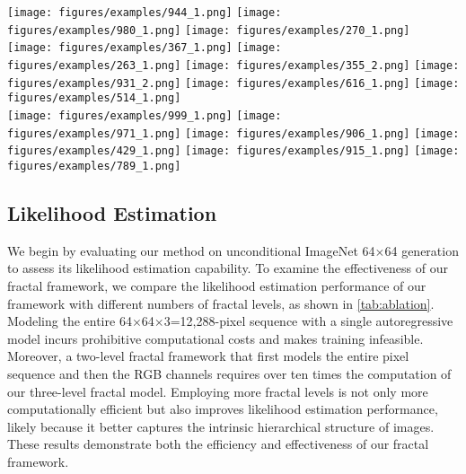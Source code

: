 \begin{figure*}[t]
\centering
\texttt{[image: figures/examples/944\_1.png]}\hhs
    \texttt{[image: figures/examples/980\_1.png]}\hhs
    \texttt{[image: figures/examples/270\_1.png]}\vvs
    \\
    \texttt{[image: figures/examples/367\_1.png]}\hhs
    \texttt{[image: figures/examples/263\_1.png]}\hhs
    \texttt{[image: figures/examples/355\_2.png]}\hhs
    \texttt{[image: figures/examples/931\_2.png]}\hhs
    \texttt{[image: figures/examples/616\_1.png]}\vvs
    \texttt{[image: figures/examples/514\_1.png]}\hhs
    \\
    \texttt{[image: figures/examples/999\_1.png]}\hhs
    \texttt{[image: figures/examples/971\_1.png]}\hhs
    \texttt{[image: figures/examples/906\_1.png]}\hhs
    \texttt{[image: figures/examples/429\_1.png]}\hhs
    \texttt{[image: figures/examples/915\_1.png]}\hhs
    \texttt{[image: figures/examples/789\_1.png]}\vvs
    \label{fig:qualitative}
\end{figure*}

\subsection{Likelihood Estimation}

We begin by evaluating our method on unconditional ImageNet 64$\times$64 generation to assess its likelihood estimation capability. To examine the effectiveness of our fractal framework, we compare the likelihood estimation performance of our framework with different numbers of fractal levels, as shown in \autoref{tab:ablation}. Modeling the entire  64$\times$64$\times$3=12,288-pixel sequence with a single autoregressive model incurs prohibitive computational costs and makes training infeasible. Moreover, a two-level fractal framework that first models the entire pixel sequence and then the RGB channels requires over ten times the computation of our three-level fractal model. Employing more fractal levels is not only more computationally efficient but also improves likelihood estimation performance, likely because it better captures the intrinsic hierarchical structure of images. These results demonstrate both the efficiency and effectiveness of our fractal framework.
 
